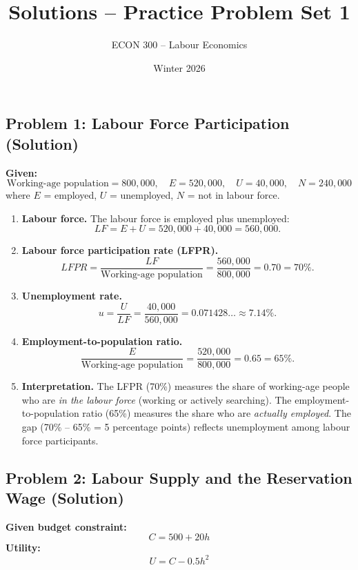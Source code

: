 \documentclass[12pt]{article}
\title{Solutions -- Practice Problem Set 1}
\author{ECON 300 -- Labour Economics}
\date{Winter 2026}
\begin{document}
\maketitle

\subsection*{Problem 1: Labour Force Participation (Solution)}

\textbf{Given:}
\[
\text{Working-age population} = 800{,}000,\quad E = 520{,}000,\quad U = 40{,}000,\quad N = 240{,}000
\]
where $E$ = employed, $U$ = unemployed, $N$ = not in labour force.

\begin{enumerate}
\item \textbf{Labour force.} The labour force is employed plus unemployed:
\[
LF = E + U = 520{,}000 + 40{,}000 = 560{,}000.
\]

\item \textbf{Labour force participation rate (LFPR).}
\[
LFPR = \frac{LF}{\text{Working-age population}} = \frac{560{,}000}{800{,}000} = 0.70 = 70\%.
\]

\item \textbf{Unemployment rate.}
\[
u = \frac{U}{LF} = \frac{40{,}000}{560{,}000} = 0.071428\ldots \approx 7.14\%.
\]

\item \textbf{Employment-to-population ratio.}
\[
\frac{E}{\text{Working-age population}} = \frac{520{,}000}{800{,}000} = 0.65 = 65\%.
\]

\item \textbf{Interpretation.} The LFPR (70\%) measures the share of working-age people who are \emph{in the labour force} (working or actively searching). The employment-to-population ratio (65\%) measures the share who are \emph{actually employed}. The gap (70\% -- 65\% = 5 percentage points) reflects unemployment among labour force participants.
\end{enumerate}

\subsection*{Problem 2: Labour Supply and the Reservation Wage (Solution)}

\textbf{Given budget constraint:}
\[
C = 500 + 20h
\]
\textbf{Utility:}
\[
U = C - 0.5h^2
\]
\end{document}
